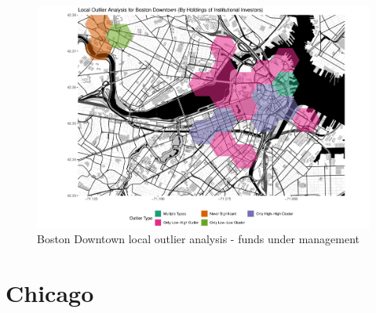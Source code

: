 \begin{figure}
	\centering
	\includegraphics[width=1\linewidth]{Figures/ChapterIV/Bos_Money_LO_Downtown}
	\caption[Boston Downtown Local Outlier Analysis - Funds Under Management 2013-2018]{Boston Downtown local outlier analysis - funds under management}
	\label{fig:bostonlocaloutlier_Downtown}
\end{figure}



\section{Chicago}


